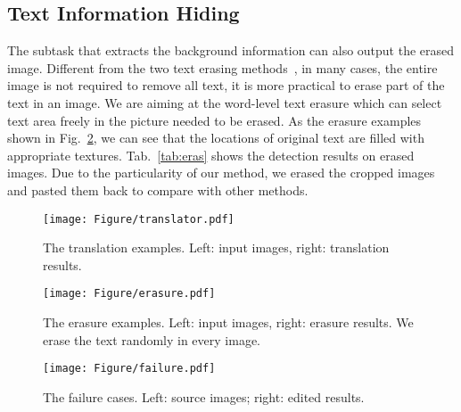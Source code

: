 \documentclass[sigconf]{acmart}
\begin{document}
\subsection{Text Information Hiding}
The subtask that extracts the background information can also output the erased image. Different from the two text erasing methods~\cite{zhang2019EnsNet,nakamura2017scene}, in many cases, the entire image is not required to remove all text, it is more practical to erase part of the text in an image. We are aiming at the word-level text erasure which can select text area freely in the picture needed to be erased. As the erasure examples shown in Fig.~\ref{fig:eras}, we can see that the locations of original text are filled with appropriate textures. Tab.~\ref{tab:eras} shows the detection results on erased images. Due to the particularity of our method, we erased the cropped images and pasted them back to compare with other methods.
\begin{figure}[t]
    \centering

    \texttt{[image: Figure/translator.pdf]}

\caption{The translation examples. Left: input images, right: translation results.}
\label{fig:translation}
\vspace{-0.1cm}
\end{figure}
\begin{figure}[t]
    \centering

    \texttt{[image: Figure/erasure.pdf]}

\caption{The erasure examples. Left: input images, right: erasure results. We erase the text randomly in every image.}
\label{fig:eras}
\vspace{-0.1cm}
\end{figure}

\begin{figure}[t]
    \centering

    \texttt{[image: Figure/failure.pdf]}

\caption{The failure cases. Left: source images; right: edited results.}
\label{fig:fail}
\vspace{-0.5cm}
\end{figure}
\end{document}
